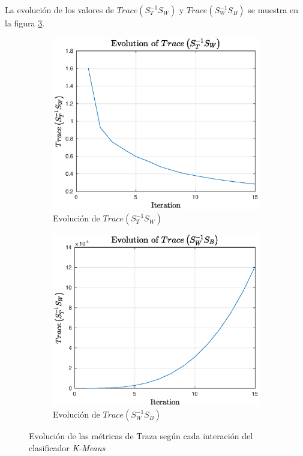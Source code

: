 \documentclass[11pt]{article} %
\begin{document}
La evolución de los valores de $Trace \left( S_T^{-1} S_W \right)$ y
$Trace \left( S_W^{-1} S_B \right)$ se muestra en la figura \ref{fig:22:traces}.

\begin{figure}[h]
    \centering
    \begin{subfigure}[b]{0.435\textwidth}
        \includegraphics[width=\textwidth]{../src/fig/22_trace1.eps}
        \caption[]{Evolución de $Trace \left( S_T^{-1} S_W \right)$}
        \label{fig:22:trace:1}
    \end{subfigure}
    \quad
    \begin{subfigure}[b]{0.435\textwidth}
        \includegraphics[width=\textwidth]{../src/fig/22_trace2.eps}
        \caption[]{Evolución de $Trace \left( S_W^{-1} S_B \right)$}
        \label{fig:22:trace:2}
    \end{subfigure}
    \caption{Evolución de las métricas de Traza según cada interación del
    clasificador \emph{K-Means}}
    \label{fig:22:traces}
\end{figure}
\end{document}

